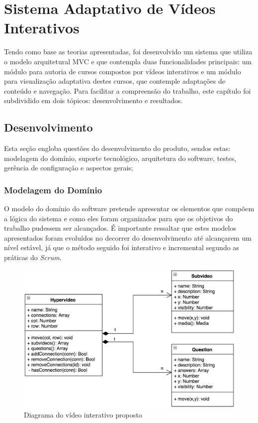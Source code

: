\chapter[Sistema Adaptativo de Vídeos Interativos]{Sistema Adaptativo de Vídeos Interativos}

Tendo como base as teorias apresentadas, foi desenvolvido um sistema que utiliza o modelo arquitetural MVC e que contempla duas funcionalidades principais: um módulo para autoria de cursos compostos por vídeos interativos e um módulo para visualização adaptativa destes cursos, que contemple adaptações de conteúdo e navegação. Para facilitar a compreensão do trabalho, este capítulo foi subdividido em dois tópicos: desenvolvimento e resultados.

\section{Desenvolvimento}

Esta seção engloba questões do desenvolvimento do produto, sendos estas: modelagem do domínio, suporte tecnológico, arquitetura do software, testes, gerência de configuração e aspectos gerais;

\subsection{Modelagem do Domínio}

O modelo do domínio do software pretende apresentar os elementos que compõem a lógica do sistema e como eles foram organizados para que os objetivos do trabalho pudessem ser alcançados. É importante ressaltar que estes modelos apresentados foram evoluídos no decorrer do desenvolvimento até alcançarem um nível estável, já que o método seguido foi interativo e incremental segundo as práticas do \textit{Scrum}.

\begin{figure}[h!]
	\centering
  	\includegraphics[width=.6\linewidth]{figuras/video.eps}
  	\caption{Diagrama do vídeo interativo proposto}
  	\label{fig:video}
\end{figure}

